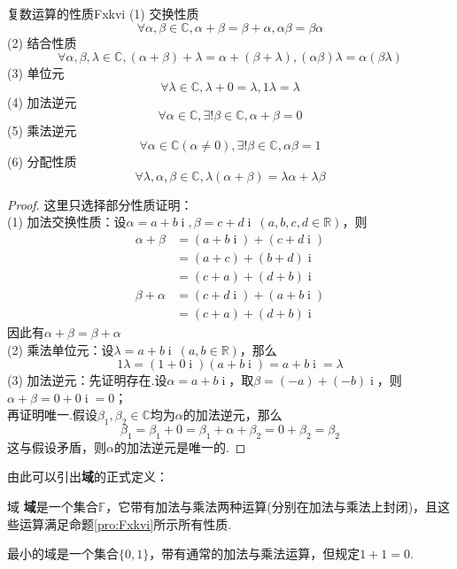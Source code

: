 \documentclass[lang=cn, zihao=4.5]{elegantbook}
\newcommand{\R}{\mathbb{R}}
\newcommand{\C}{\mathbb{C}}
\newcommand{\F}{\mathbb{F}}
\DeclareMathOperator{\ic}{i}
\begin{document}
\begin{proposition}{复数运算的性质}{Fxkvi}
	(1) 交换性质$$\forall \alpha , \beta \in \C , \alpha + \beta = \beta + \alpha , \alpha \beta = \beta \alpha$$
	(2) 结合性质$$\forall \alpha , \beta , \lambda \in \C , (\alpha + \beta) + \lambda = \alpha + (\beta + \lambda) , (\alpha \beta) \lambda = \alpha (\beta \lambda)$$
	(3) 单位元$$\forall \lambda \in \C , \lambda + 0 = \lambda , 1 \lambda = \lambda$$
	(4) 加法逆元$$\forall \alpha \in \C , \exists ! \beta \in \C , \alpha + \beta = 0$$
	(5) 乘法逆元$$\forall \alpha \in \C (\alpha \neq 0) , \exists ! \beta \in \C , \alpha \beta = 1$$
	(6) 分配性质$$\forall \lambda , \alpha , \beta \in \C , \lambda (\alpha + \beta) = \lambda \alpha + \lambda \beta$$
\end{proposition}
\begin{proof}
	这里只选择部分性质证明： \\
	(1) 加法交换性质：设$\alpha = a+b\ic , \beta = c+d\ic ~(a,b,c,d \in \R )$，则
	\begin{align*}
		\alpha + \beta &= (a+b\ic ) + (c+d\ic ) \\
		&= (a+c) + (b+d)\ic \\
		&= (c+a) + (d+b)\ic \\
		\beta + \alpha &= (c+d\ic ) + (a+b\ic ) \\
		&= (c+a) + (d+b)\ic
	\end{align*}
	因此有$\alpha + \beta = \beta + \alpha$ \\
	(2) 乘法单位元：设$\lambda = a+b\ic ~ (a,b \in \R )$，那么$$1 \lambda = (1+0\ic )(a+b\ic ) = a + b\ic = \lambda$$
	(3) 加法逆元：先证明存在.设$\alpha = a+b\ic $，取$\beta = (-a) + (-b)\ic $，则$\alpha + \beta = 0+0\ic = 0$；\\
	再证明唯一.假设$\beta _1, \beta _2 \in \C $均为$\alpha$的加法逆元，那么$$\beta _1 = \beta _1 + 0 = \beta _1 + \alpha + \beta _2 = 0 + \beta _2 = \beta _2$$
	这与假设矛盾，则$\alpha$的加法逆元是唯一的.
\end{proof}

由此可以引出\textbf{域}的正式定义：

\begin{definition}{域}
	\textbf{域}是一个集合$\F$，它带有加法与乘法两种运算(分别在加法与乘法上封闭)，且这些运算满足命题\ref{pro:Fxkvi}所示所有性质.
\end{definition}
\begin{remark}
	最小的域是一个集合$\{ 0,1 \}$，带有通常的加法与乘法运算，但规定$1+1=0$.
\end{remark}
\end{document}
